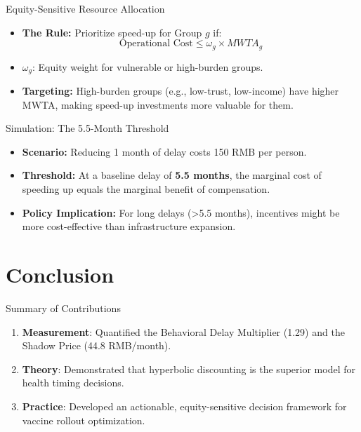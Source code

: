 \documentclass[10pt, aspectratio=169, xcolor={svgnames}]{beamer}
\begin{document}
\begin{frame}{Equity-Sensitive Resource Allocation}
    \begin{itemize}
        \item \textbf{The Rule:} Prioritize speed-up for Group $g$ if:
            \[ \text{Operational Cost} \le \omega_g \times MWTA_g \]
        \item \textbf{$\omega_g$}: Equity weight for vulnerable or high-burden groups.
        \item \textbf{Targeting:} High-burden groups (e.g., low-trust, low-income) have higher MWTA, making speed-up investments more valuable for them.
    \end{itemize}
\end{frame}

\begin{frame}{Simulation: The 5.5-Month Threshold}
    \begin{itemize}
        \item \textbf{Scenario:} Reducing 1 month of delay costs 150 RMB per person.
        \item \textbf{Threshold:} At a baseline delay of \textbf{5.5 months}, the marginal cost of speeding up equals the marginal benefit of compensation.
        \item \textbf{Policy Implication:} For long delays (>5.5 months), incentives might be more cost-effective than infrastructure expansion.
    \end{itemize}
\end{frame}

\section{Conclusion}

\begin{frame}{Summary of Contributions}
    \begin{enumerate}
        \item \textbf{Measurement}: Quantified the Behavioral Delay Multiplier (1.29) and the Shadow Price (44.8 RMB/month).
        \item \textbf{Theory}: Demonstrated that hyperbolic discounting is the superior model for health timing decisions.
        \item \textbf{Practice}: Developed an actionable, equity-sensitive decision framework for vaccine rollout optimization.
    \end{enumerate}
\end{frame}
\end{document}
